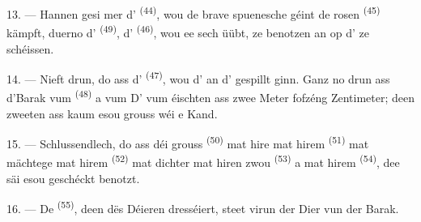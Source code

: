 13. --- Hannen gesi mer d' \textsuperscript{(44)}, wou de brave
spuenesche  géint de rosen  \textsuperscript{(45)}
kämpft, duerno d' \textsuperscript{(49)}, d'
\textsuperscript{(46)}, wou ee sech üübt,  ze benotzen an op
d' ze schéissen.

14. --- Nieft drun, do ass d' \textsuperscript{(47)}, wou
d' an d' gespillt ginn. Ganz no drun ass d'Barak vum
 \textsuperscript{(48)} a vum  D' vum
éischten ass zwee Meter fofzéng Zentimeter; deen zweeten ass kaum esou grouss wéi e
Kand.

15. --- Schlussendlech, do ass déi grouss  \textsuperscript{(50)}
mat hire  mat hirem  \textsuperscript{(51)} mat
mächtege  mat hirem  \textsuperscript{(52)} mat
dichter  mat hiren zwou  \textsuperscript{(53)} a mat
hirem  \textsuperscript{(54)}, dee säi  esou geschéckt
benotzt.

16. --- De  \textsuperscript{(55)}, deen dës Déieren dresséiert,
steet virun der Dier vun der Barak.

\VUsaut{6.0mm}
\VUfilet{22mm}
